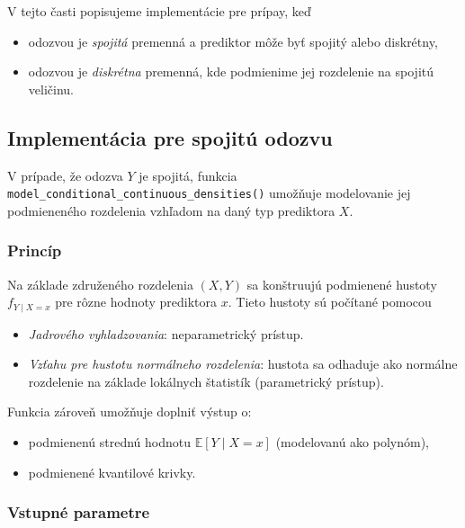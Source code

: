 V tejto časti popisujeme implementácie pre prípay, keď
\begin{itemize}
\setlength{\itemsep}{0pt}
  \setlength{\parskip}{0pt}
  \item odozvou je \textit{spojitá} premenná a prediktor môže byť spojitý alebo diskrétny,
  \item odozvou je \textit{diskrétna} premenná, kde podmienime jej rozdelenie na spojitú veličinu.
\end{itemize}

\subsection{Implementácia pre spojitú odozvu}

V prípade, že odozva $Y$ je spojitá, funkcia \texttt{model\_conditional\_continuous\_densities()} umožňuje modelovanie jej podmieneného rozdelenia vzhľadom na daný typ prediktora $X$.

\subsubsection{Princíp}  
Na základe združeného rozdelenia $(X,Y)$ sa konštruujú podmienené hustoty $f_{Y \mid X = x}$ pre rôzne hodnoty prediktora $x$. Tieto hustoty sú počítané pomocou

\begin{itemize}
\setlength{\itemsep}{0pt}
  \setlength{\parskip}{0pt}
  \item \textit{Jadrového vyhladzovania}: neparametrický prístup.
  \item \textit{Vzťahu pre hustotu normálneho rozdelenia}: hustota sa odhaduje ako normálne rozdelenie na základe lokálnych štatistík (parametrický prístup).
\end{itemize}

Funkcia zároveň umožňuje doplniť výstup o:
\begin{itemize}
\setlength{\itemsep}{0pt}
  \setlength{\parskip}{0pt}
  \item podmienenú strednú hodnotu $\mathbb{E}[Y \mid X=x]$ (modelovanú ako polynóm),
  \item podmienené kvantilové krivky.
\end{itemize}

\subsubsection{Vstupné parametre}


